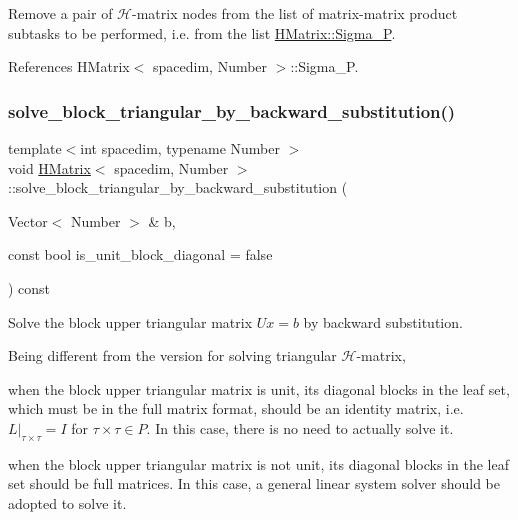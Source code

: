 Remove a pair of $\mathcal{H}$-\/matrix nodes from the list of matrix-\/matrix product subtasks to be performed, i.\+e. from the list {\ttfamily \hyperlink{classHMatrix_a3d96d0252ef8c873ae06cf87874acaf3}{H\+Matrix\+::\+Sigma\+\_\+P}}. 

References H\+Matrix$<$ spacedim, Number $>$\+::\+Sigma\+\_\+P.

\mbox{\label{classHMatrix_aa81db0ff79182302de83d693bab9f9e3}} 
\subsubsection{\texorpdfstring{solve\+\_\+block\+\_\+triangular\+\_\+by\+\_\+backward\+\_\+substitution()}{solve\_block\_triangular\_by\_backward\_substitution()}\hspace{0.1cm}{\footnotesize\ttfamily [1/2]}}
{\footnotesize\ttfamily template$<$int spacedim, typename Number $>$ \\
void \hyperlink{classHMatrix}{H\+Matrix}$<$ spacedim, Number $>$\+::solve\+\_\+block\+\_\+triangular\+\_\+by\+\_\+backward\+\_\+substitution (\begin{DoxyParamCaption}\item[{Vector$<$ Number $>$ \&}]{b,  }\item[{const bool}]{is\+\_\+unit\+\_\+block\+\_\+diagonal = {\ttfamily false} }\end{DoxyParamCaption}) const}

Solve the block upper triangular matrix $Ux=b$ by backward substitution.

Being different from the version for solving triangular $\mathcal{H}$-\/matrix,


\begin{DoxyEnumerate}
\item when the block upper triangular matrix is unit, its diagonal blocks in the leaf set, which must be in the full matrix format, should be an identity matrix, i.\+e. $L\vert_{\tau\times\tau} = I$ for $\tau\times\tau \in P$. In this case, there is no need to actually solve it.
\item when the block upper triangular matrix is not unit, its diagonal blocks in the leaf set should be full matrices. In this case, a general linear system solver should be adopted to solve it.
\end{DoxyEnumerate}

